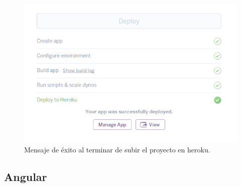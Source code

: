 \begin{figure}[H]
	\centering
	\includegraphics[width=0.7\linewidth]{images/tecnologias/heroku6.PNG}
	\caption{Mensaje de éxito al terminar de subir el proyecto en heroku.}
\end{figure}

\subsection{Angular}
